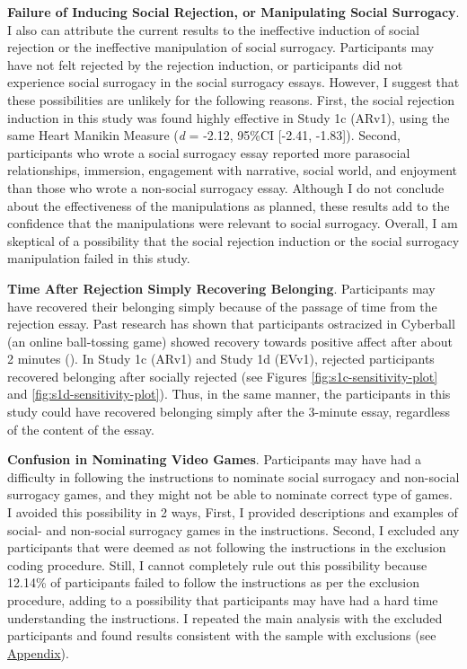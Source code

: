 \documentclass[
]{udthesis}
\begin{document}
\textbf{Failure of Inducing Social Rejection, or Manipulating Social Surrogacy}. I also can attribute the current results to the ineffective induction of social rejection or the ineffective manipulation of social surrogacy. Participants may have not felt rejected by the rejection induction, or participants did not experience social surrogacy in the social surrogacy essays. However, I suggest that these possibilities are unlikely for the following reasons. First, the social rejection induction in this study was found highly effective in Study 1c (ARv1), using the same Heart Manikin Measure (\emph{d} = -2.12, 95\%CI {[}-2.41, -1.83{]}). Second, participants who wrote a social surrogacy essay reported more parasocial relationships, immersion, engagement with narrative, social world, and enjoyment than those who wrote a non-social surrogacy essay. Although I do not conclude about the effectiveness of the manipulations as planned, these results add to the confidence that the manipulations were relevant to social surrogacy. Overall, I am skeptical of a possibility that the social rejection induction or the social surrogacy manipulation failed in this study.

\textbf{Time After Rejection Simply Recovering Belonging}. Participants may have recovered their belonging simply because of the passage of time from the rejection essay. Past research has shown that participants ostracized in Cyberball (an online ball-tossing game) showed recovery towards positive affect after about 2 minutes (). In Study 1c (ARv1) and Study 1d (EVv1), rejected participants recovered belonging after socially rejected (see Figures \ref{fig:s1c-sensitivity-plot} and \ref{fig:s1d-sensitivity-plot}). Thus, in the same manner, the participants in this study could have recovered belonging simply after the 3-minute essay, regardless of the content of the essay.

\textbf{Confusion in Nominating Video Games}. Participants may have had a difficulty in following the instructions to nominate social surrogacy and non-social surrogacy games, and they might not be able to nominate correct type of games. I avoided this possibility in 2 ways, First, I provided descriptions and examples of social- and non-social surrogacy games in the instructions. Second, I excluded any participants that were deemed as not following the instructions in the exclusion coding procedure. Still, I cannot completely rule out this possibility because 12.14\% of participants failed to follow the instructions as per the exclusion procedure, adding to a possibility that participants may have had a hard time understanding the instructions. I repeated the main analysis with the excluded participants and found results consistent with the sample with exclusions (see \hyperref[main-analysis-with-excluded-participants]{Appendix}).
\end{document}
